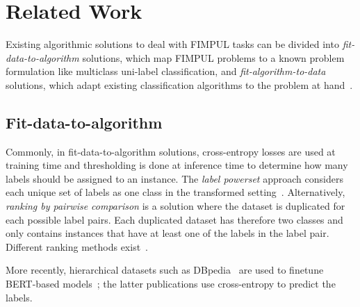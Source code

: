 
\section{Related Work}
\label{sec:org2aceb9f}


Existing algorithmic solutions to deal with FIMPUL tasks can be divided into \emph{fit-data-to-algorithm} solutions, which map FIMPUL problems to a known problem formulation like multiclass uni-label classification, and \emph{fit-algorithm-to-data} solutions, which adapt existing classification
algorithms to the problem at hand~\citep{multilabelMethods}.

\subsection{Fit-data-to-algorithm}
Commonly, in fit-data-to-algorithm solutions, cross-entropy losses are used at training time and thresholding is done at inference time to determine how many labels should be assigned to an instance.
The \textit{label powerset} approach considers each unique set of labels as one class in the transformed setting~\cite{multilabelComparison}.
Alternatively, \textit{ranking by pairwise comparison} is a solution where the dataset is duplicated for each possible label pairs. Each duplicated dataset has therefore two classes and only contains instances that have at least one of the labels in the label pair. Different ranking methods exist~\cite{pairwiseBinary, pairwiseNet}.

More recently, hierarchical datasets such as DBpedia~\citep{lehmann2015dbpedia} are used to finetune BERT-based models~\cite{XLNet, bigBird};  the latter publications use cross-entropy to predict the labels.

